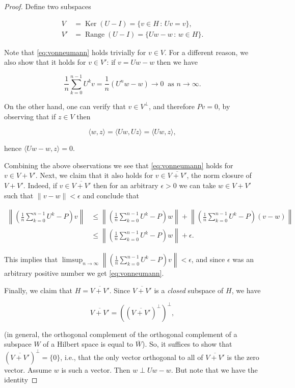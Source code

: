 \documentclass[11pt]{report}
\theoremstyle{plain}
\theoremstyle{definition}
\begin{document}
\begin{proof}
Define two subspaces

\begin{align*}
V&=\operatorname{Ker}(U-I) = \{ v\in H\,:\, Uv=v \}, \\
V'&=\operatorname{Range}(U-I) = \{ Uw-w \,:\, w\in H \}.
\end{align*}

\noindent Note that \eqref{eq:vonneumann} holds trivially for
$v\in V$. For a different reason, we also show that
it holds for $v\in V'$: if $v=Uw-w$ then we have

\[
\frac{1}{n}\sum_{k=0}^{n-1} U^k v  = \frac{1}{n}\left( U^n w - w \right) \to 0\ \textrm{ as }n\to\infty.
\]

\noindent On the other hand, one can verify that $v\in V^\perp$,
and therefore $Pv=0$, by observing that if $z\in V$
then

\[
\langle w, z \rangle = \langle Uw,Uz \rangle =
\langle Uw,z\rangle,
\]

\noindent hence $\langle Uw-w,z\rangle = 0$.

Combining the above observations we see that
\eqref{eq:vonneumann} holds for $v\in V+V'$. Next, we
claim that it also holds for $v\in \overline{V+V'}$,
the norm closure of $V+V'$. Indeed, if
$v\in \overline{V+V'}$ then for an arbitrary
$\epsilon>0$ we can take $w\in V+V'$ such that
$\lVert v-w\rVert < \epsilon$ and conclude that

\begin{align*}
\left\lVert \left(\frac{1}{n}\sum_{k=0}^{n-1} U^k-P\right)v \right\rVert
& \le
\left\lVert \left(\frac{1}{n}\sum_{k=0}^{n-1} U^k-P\right)w \right\rVert
+
\left\lVert \left(\frac{1}{n}\sum_{k=0}^{n-1} U^k-P\right)(v-w) \right\rVert \\
& \le
\left\lVert \left(\frac{1}{n}\sum_{k=0}^{n-1} U^k-P\right)w \right\rVert
+  \epsilon.
\end{align*}

\noindent This implies that
$\limsup_{n\to\infty} \left\lVert
\left(\frac{1}{n}\sum_{k=0}^{n-1} U^k-P\right)v
\right\rVert < \epsilon$,
and since $\epsilon$ was an arbitrary positive number
we get \eqref{eq:vonneumann}.

Finally, we claim that $H=\overline{V+V'}$. Since
$\overline{V+V'}$ is a \emph{closed} subspace of $H$, we
have

\[
\overline{V+V'} = \left( \left(\overline{V+V'}\right)^\perp \right)^\perp,
\]

\noindent (in general, the orthogonal complement of the
orthogonal complement of a subspace $W$ of a Hilbert
space is equal to $\overline{W}$). So, it suffices to
show that $\left(\overline{V+V'}\right)^\perp=\{0\}$,
i.e., that the only vector orthogonal to all of
$\overline{V+V'}$ is the zero vector. Assume $w$ is
such a vector. Then $w \perp Uw-w$. But note that we
have the identity


\end{proof}
\end{document}
